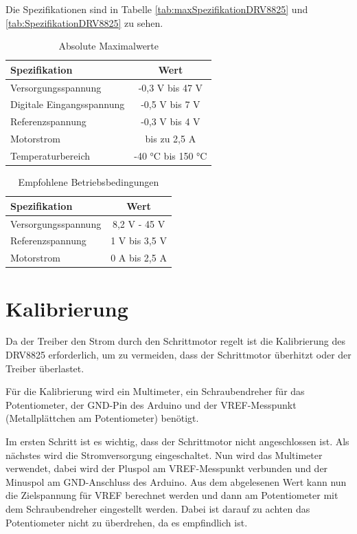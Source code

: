 Die Spezifikationen sind in Tabelle \autoref{tab:maxSpezifikationDRV8825} und \autoref{tab:SpezifikationDRV8825} zu sehen.

\begin{table}[htpb]
	\centering
	\begin{tabular}{|l|c|}
		\hline
		\textbf{Spezifikation} & \textbf{Wert} \\
		\hline
		Versorgungsspannung & -0,3 V bis 47 V \\
		Digitale Eingangsspannung & -0,5 V bis 7 V \\
		Referenzspannung & -0,3 V bis 4 V \\
		Motorstrom & bis zu 2,5 A \\
		Temperaturbereich & -40 °C bis 150 °C \\
		\hline
	\end{tabular}
	\caption{Absolute Maximalwerte}
	\label{tab:maxSpezifikationDRV8825}
\end{table}

\begin{table}[htpb]
	\centering
	\begin{tabular}{|l|c|}
		\hline
		\textbf{Spezifikation} & \textbf{Wert} \\
		\hline
		Versorgungsspannung & 8,2 V - 45 V \\
		Referenzspannung & 1 V bis 3,5 V \\
		Motorstrom & 0 A bis 2,5 A \\
		\hline
	\end{tabular}
	\caption{Empfohlene Betriebsbedingungen}
	\label{tab:SpezifikationDRV8825}
\end{table}

\section{Kalibrierung}

Da der Treiber den Strom durch den Schrittmotor regelt ist die Kalibrierung des DRV8825 erforderlich, um zu vermeiden, dass der Schrittmotor überhitzt oder der Treiber überlastet. 

Für die Kalibrierung wird ein Multimeter, ein Schraubendreher für das Potentiometer, der GND-Pin des Arduino und der VREF-Messpunkt (Metallplättchen am Potentiometer) benötigt.

Im ersten Schritt ist es wichtig, dass der Schrittmotor nicht angeschlossen ist. Als nächstes wird die Stromversorgung eingeschaltet. Nun wird das Multimeter verwendet, dabei wird der Pluspol am VREF-Messpunkt verbunden und der Minuspol am GND-Anschluss des Arduino. Aus dem abgelesenen Wert kann nun die Zielspannung für VREF berechnet werden und dann am Potentiometer mit dem Schraubendreher eingestellt werden. Dabei ist darauf zu achten das Potentiometer nicht zu überdrehen, da es empfindlich ist. 

